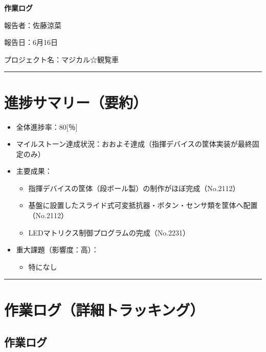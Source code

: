 \documentclass[uplatex,dvipdfmx,a4paper,11pt]{jsarticle}
\newcommand{\sectionrule}{\par\medskip\noindent\rule{\linewidth}{0.6pt}\par\medskip}
\begin{document}
{\LARGE\bfseries 作業ログ}\par\bigskip

報告者：佐藤涼菜

報告日：6月16日

プロジェクト名：マジカル☆観覧車

\sectionrule


\section{進捗サマリー（要約）}

\begin{itemize}
  \item 全体進捗率：80[％]
  \item マイルストーン達成状況：おおよそ達成（指揮デバイスの筐体実装が最終固定のみ）
  \item 主要成果：
    \begin{itemize}
      \item {指揮デバイスの筐体（段ボール製）の制作がほぼ完成（No.2112）}
      \item {基盤に設置したスライド式可変抵抗器・ボタン・センサ類を筐体へ配置（No.2112）}
      \item {LEDマトリクス制御プログラムの完成（No.2231）}
    \end{itemize}
  \item 重大課題（影響度：高）：
    \begin{itemize}
      \item {特になし}
    \end{itemize}
\end{itemize}

\sectionrule


\section{作業ログ（詳細トラッキング）}

\subsection{作業ログ}

\renewcommand{\arraystretch}{1.2}

\small
\end{document}
